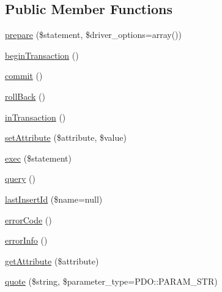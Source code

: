 \subsection*{Public Member Functions}
\begin{DoxyCompactItemize}
\item 
\mbox{\hyperlink{interface_pes_1_1_database_1_1_handler_1_1_p_d_o_interface_af212c3950522906fe864096a27c24156}{prepare}} (\$statement, \$driver\+\_\+options=array())
\item 
\mbox{\hyperlink{interface_pes_1_1_database_1_1_handler_1_1_p_d_o_interface_af3380f3b13931d581fa973a382946b32}{begin\+Transaction}} ()
\item 
\mbox{\hyperlink{interface_pes_1_1_database_1_1_handler_1_1_p_d_o_interface_af5674c27d4a92f6228565010eacbb9cb}{commit}} ()
\item 
\mbox{\hyperlink{interface_pes_1_1_database_1_1_handler_1_1_p_d_o_interface_aebaea4cae21e0e75ec1489c1648caeb3}{roll\+Back}} ()
\item 
\mbox{\hyperlink{interface_pes_1_1_database_1_1_handler_1_1_p_d_o_interface_aaf34a959f7c26d1f97713adab5a6c429}{in\+Transaction}} ()
\item 
\mbox{\hyperlink{interface_pes_1_1_database_1_1_handler_1_1_p_d_o_interface_aa4ddbee482d43ef83316a45744be018e}{set\+Attribute}} (\$attribute, \$value)
\item 
\mbox{\hyperlink{interface_pes_1_1_database_1_1_handler_1_1_p_d_o_interface_aa14a8f8ef2c7ed2b8985d28b336941c9}{exec}} (\$statement)
\item 
\mbox{\hyperlink{interface_pes_1_1_database_1_1_handler_1_1_p_d_o_interface_a8dbd35d765e8ff0d1c34461ef67c5abf}{query}} ()
\item 
\mbox{\hyperlink{interface_pes_1_1_database_1_1_handler_1_1_p_d_o_interface_a9f9cb8ca720d7bbcb03869def521336e}{last\+Insert\+Id}} (\$name=null)
\item 
\mbox{\hyperlink{interface_pes_1_1_database_1_1_handler_1_1_p_d_o_interface_a928a98b280c4dd8971ce6998eb157409}{error\+Code}} ()
\item 
\mbox{\hyperlink{interface_pes_1_1_database_1_1_handler_1_1_p_d_o_interface_ac5230ce6cd46c5e922146a441d807877}{error\+Info}} ()
\item 
\mbox{\hyperlink{interface_pes_1_1_database_1_1_handler_1_1_p_d_o_interface_ac8ff6f1aa68f8462ac6c3593c8071cc6}{get\+Attribute}} (\$attribute)
\item 
\mbox{\hyperlink{interface_pes_1_1_database_1_1_handler_1_1_p_d_o_interface_a974d5921d0480c64f94c09994b8c0b48}{quote}} (\$string, \$parameter\+\_\+type=P\+D\+O\+::\+P\+A\+R\+A\+M\+\_\+\+S\+TR)
\end{DoxyCompactItemize}
